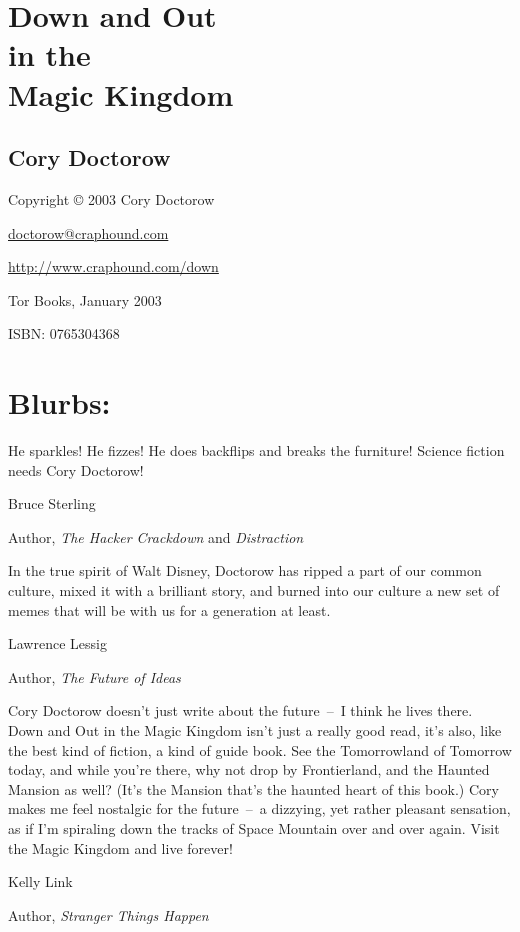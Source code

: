 \section{Down and Out\\in the\\Magic Kingdom}

\subsection{Cory Doctorow}

Copyright © 2003 Cory Doctorow

\href{mailto:doctorow@craphound.com}{doctorow@craphound.com}

\href{http://www.craphound.com/down}{http://www.craphound.com/down}

Tor Books, January 2003

ISBN: 0765304368

\section{Blurbs:}

He sparkles! He fizzes! He does backflips and breaks the furniture!
Science fiction needs Cory Doctorow!

Bruce Sterling

Author, \emph{The Hacker Crackdown} and \emph{Distraction}

In the true spirit of Walt Disney, Doctorow has ripped a part of
our common culture, mixed it with a brilliant story, and burned
into our culture a new set of memes that will be with us for a
generation at least.

Lawrence Lessig

Author, \emph{The Future of Ideas}

Cory Doctorow doesn't just write about the future~–~I think he
lives there. Down and Out in the Magic Kingdom isn't just a really
good read, it's also, like the best kind of fiction, a kind of
guide book. See the Tomorrowland of Tomorrow today, and while
you're there, why not drop by Frontierland, and the Haunted Mansion
as well? (It's the Mansion that's the haunted heart of this book.)
Cory makes me feel nostalgic for the future~–~a dizzying, yet
rather pleasant sensation, as if I'm spiraling down the tracks of
Space Mountain over and over again. Visit the Magic Kingdom and
live forever!

Kelly Link

Author, \emph{Stranger Things Happen}


